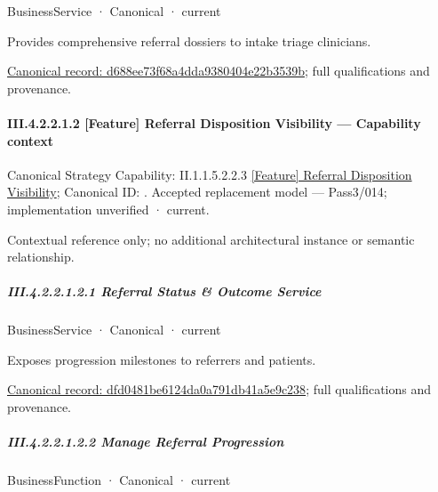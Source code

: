 \label{element:d688ee73f68a4dda9380404e22b3539b}
{\small BusinessService · Canonical · current}\par

Provides comprehensive referral dossiers to intake triage clinicians.


{\footnotesize \href{../../../../../../../../continuum/business/business-service/d688ee73f68a4dda9380404e22b3539b.md}{Canonical record: d688ee73f68a4dda9380404e22b3539b}; full qualifications and provenance.}\par
\paragraph*{III.4.2.2.1.2 [Feature] Referral Disposition Visibility — Capability context}
\label{navigation:III.4.2.2.1.2}

{\small Canonical Strategy Capability: II.1.1.5.2.2.3 \hyperref[element:5d2689578a074088adbd79e5dccdfa4f]{[Feature] Referral Disposition Visibility}; Canonical ID: \texttt{}. Accepted replacement model — Pass3/014; implementation unverified · current.}\par
Contextual reference only; no additional architectural instance or semantic relationship.\par
\subparagraph*{III.4.2.2.1.2.1 Referral Status \& Outcome Service}
\label{navigation:III.4.2.2.1.2.1}

\label{element:dfd0481be6124da0a791db41a5e9c238}
{\small BusinessService · Canonical · current}\par

Exposes progression milestones to referrers and patients.


{\footnotesize \href{../../../../../../../../continuum/business/business-service/dfd0481be6124da0a791db41a5e9c238.md}{Canonical record: dfd0481be6124da0a791db41a5e9c238}; full qualifications and provenance.}\par
\subparagraph*{III.4.2.2.1.2.2 Manage Referral Progression}
\label{navigation:III.4.2.2.1.2.2}

\label{element:7f9f01be4fd14facb943de5f63f1d8fd}
{\small BusinessFunction · Canonical · current}\par

